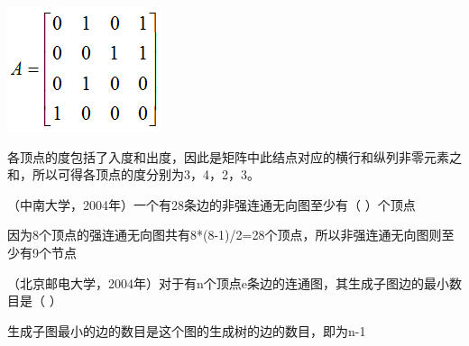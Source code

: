\includegraphics[width=1.77083in,height=1.43750in]{computerassets/596518D94738A905011156D7D79F7DEE.png}
\par{}
\begin{solution}各顶点的度包括了入度和出度，因此是矩阵中此结点对应的横行和纵列非零元素之和，所以可得各顶点的度分别为3，4，2，3。
\end{solution}
\question （中南大学，2004年）一个有28条边的非强连通无向图至少有（ ）个顶点
\par{}
\begin{solution}因为8个顶点的强连通无向图共有8*(8-1)/2=28个顶点，所以非强连通无向图则至少有9个节点
\end{solution}
\question （北京邮电大学，2004年）对于有n个顶点e条边的连通图，其生成子图边的最小数目是（
）
\par{}
\begin{solution}生成子图最小的边的数目是这个图的生成树的边的数目，即为n-1
\end{solution}
